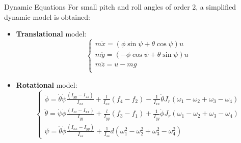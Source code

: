 \documentclass{thesisbeamer}
\begin{document}
\begin{frame}[t]{Dynamic Equations} \vspace{4pt}
For small pitch and roll angles of order 2, a simplified dynamic model is obtained: 

\begin{itemize}
	\item \textbf{Translational} model:
\begin{equation}\label{translational_model_E_L_Simplified}
\begin{cases}
m \ddot{x} = (\phi \sin \psi + \theta \cos \psi)u \\
m \ddot{y} = (- \phi \cos \psi + \theta \sin \psi)u \\
m \ddot{z} = u - mg \\
\end{cases}
\end{equation}
	\item \textbf{Rotational} model:
\begin{equation}\label{N_E_rotation_equation_small_angles}
\begin{cases}
\ddot{\phi} = \dot{\theta} \dot{\psi} \frac{(I_{yy}-I_{zz})}{I_{xx}} + \frac{l}{I_{xx}}(f_4-f_2) - \frac{1}{I_{xx}} \dot{\theta} J_r (\omega_1 - \omega_2 + \omega_3 - \omega_4) \\
\ddot{\theta} = \dot{\psi} \dot{\phi} \frac{(I_{zz}-I_{xx})}{I_{yy}} + \frac{l}{I_{yy}}(f_3-f_1) + \frac{1}{I_{yy}} \dot{\phi} J_r (\omega_1 - \omega_2 + \omega_3 - \omega_4) \\
\ddot{\psi} = \dot{\theta} \dot{\phi} \frac{(I_{xx}-I_{yy})}{I_{zz}} + \frac{1}{I_{zz}} d (\omega_1^2 -\omega_2^2 + \omega_3^2 - \omega_4^2)
\end{cases}
\end{equation}	
\end{itemize}

\end{frame}
\end{document}
